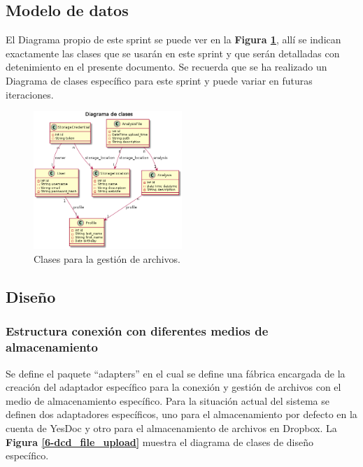 \subsection{Modelo de datos}
El Diagrama propio de este sprint se puede ver en la \textbf{Figura \ref{6-clases_file_upload}}, allí se indican exactamente las clases que se usarán en este sprint y que serán detalladas con detenimiento en el presente documento. Se recuerda que se ha realizado un Diagrama de clases específico para este sprint y puede variar en futuras iteraciones.
    \begin{figure}[h]
        \centering
        \includegraphics[width=0.5\textwidth]{img/dc_file_upload}
        \caption{Clases para la gestión de archivos.}
		\label{6-clases_file_upload}
    \end{figure}


\subsection{Diseño} 

\subsubsection{Estructura conexión con diferentes medios de almacenamiento}
	Se define el paquete ``adapters'' en el cual se define una fábrica encargada de la creación del adaptador específico para la conexión y gestión de archivos con el medio de almacenamiento específico. Para la situación actual del sistema se definen dos adaptadores específicos, uno para el almacenamiento por defecto en la cuenta de YesDoc y otro para el almacenamiento de archivos en Dropbox. La \textbf{Figura \ref{6-dcd_file_upload}} muestra el diagrama de clases de diseño específico.

